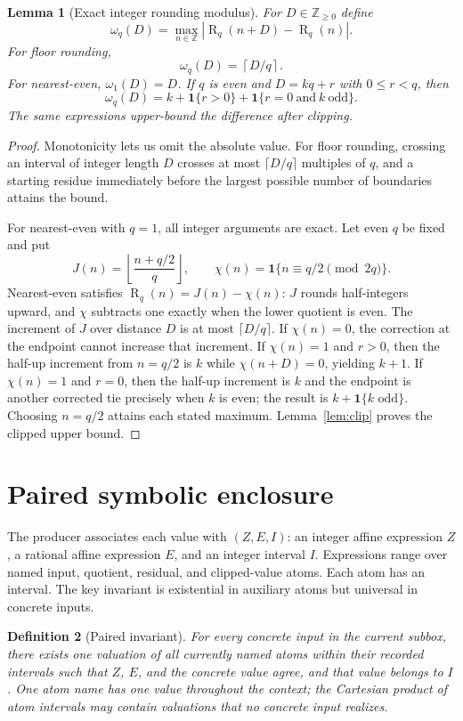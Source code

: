 \documentclass[11pt]{article}
\newtheorem{definition}{Definition}[section]
\newtheorem{lemma}[definition]{Lemma}
\newcommand{\Z}{\mathbb Z}
\newcommand{\R}{\operatorname{R}}
\begin{document}
\begin{lemma}[Exact integer rounding modulus]\label{lem:modulus}
For $D\in\Z_{\ge0}$ define
\[
 \omega_q(D)=\max_{n\in\Z}|\R_q(n+D)-\R_q(n)|.
\]
For floor rounding,
\[
 \omega_q(D)=\left\lceil D/q\right\rceil.
\]
For nearest-even, $\omega_1(D)=D$. If $q$ is even and $D=kq+r$ with $0\le r<q$, then
\[
 \omega_q(D)=k+\mathbf 1\{r>0\}+\mathbf 1\{r=0\ \text{and}\ k\ \text{odd}\}.
\]
The same expressions upper-bound the difference after clipping.
\end{lemma}
\begin{proof}
Monotonicity lets us omit the absolute value. For floor rounding, crossing an interval of integer length $D$ crosses at most $\lceil D/q\rceil$ multiples of $q$, and a starting residue immediately before the largest possible number of boundaries attains the bound.

For nearest-even with $q=1$, all integer arguments are exact. Let even $q$ be fixed and put
\[
 J(n)=\left\lfloor\frac{n+q/2}{q}\right\rfloor,
 \qquad
 \chi(n)=\mathbf 1\{n\equiv q/2\pmod{2q}\}.
\]
Nearest-even satisfies $\R_q(n)=J(n)-\chi(n)$: $J$ rounds half-integers upward, and $\chi$ subtracts one exactly when the lower quotient is even. The increment of $J$ over distance $D$ is at most $\lceil D/q\rceil$.
If $\chi(n)=0$, the correction at the endpoint cannot increase that increment. If $\chi(n)=1$ and $r>0$, then the half-up increment from $n=q/2$ is $k$ while $\chi(n+D)=0$, yielding $k+1$. If $\chi(n)=1$ and $r=0$, then the half-up increment is $k$ and the endpoint is another corrected tie precisely when $k$ is even; the result is $k+\mathbf 1\{k\text{ odd}\}$. Choosing $n=q/2$ attains each stated maximum. Lemma~\ref{lem:clip} proves the clipped upper bound.
\end{proof}

\section{Paired symbolic enclosure}
The producer associates each value with $(Z,E,I)$: an integer affine expression $Z$, a rational affine expression $E$, and an integer interval $I$. Expressions range over named input, quotient, residual, and clipped-value atoms. Each atom has an interval. The key invariant is existential in auxiliary atoms but universal in concrete inputs.

\begin{definition}[Paired invariant]\label{def:paired}
For every concrete input in the current subbox, there exists one valuation of all currently named atoms within their recorded intervals such that $Z$, $E$, and the concrete value agree, and that value belongs to $I$. One atom name has one value throughout the context; the Cartesian product of atom intervals may contain valuations that no concrete input realizes.
\end{definition}
\end{document}
